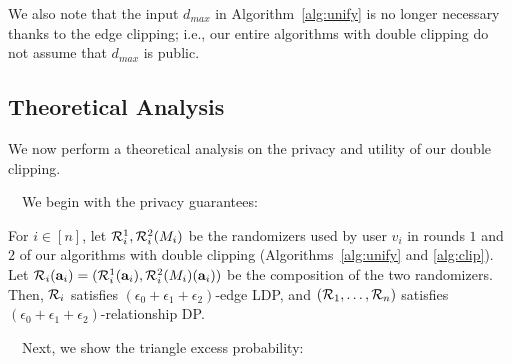 We also note that the input $d_{max}$ in Algorithm~\ref{alg:unify} is no longer necessary thanks to the edge clipping; i.e., our entire algorithms with double clipping do not assume that $d_{max}$ is public. 

\subsection{Theoretical Analysis}
\label{sub:clip_theoretical_analysis}
We now perform a theoretical analysis on the privacy and utility of our double clipping. 

\smallskip
{}~~We begin with the privacy guarantees:
\begin{theorem}\label{thm:privacy_DC}
  For $i \in [n]$, 
  let $\mathcal{R}_i^1, \mathcal{R}_i^2(M_i)$ be the randomizers used by user $v_i$ in
  rounds $1$ and $2$ of our algorithms with double clipping (Algorithms~\ref{alg:unify} and \ref{alg:clip}). 
  Let $\mathcal{R}_i(\mathbf{a}_i) = (\mathcal{R}_i^1(\mathbf{a}_i), \mathcal{R}_i^2(M_i)(\mathbf{a}_i))$ 
  be the composition of the two randomizers. 
  Then,
  $\mathcal{R}_i$ satisfies $(\epsilon_0 + \epsilon_1 + \epsilon_2)$-edge LDP, 
  and $(\mathcal{R}_1,
  \ldots, \mathcal{R}_n)$ satisfies $(\epsilon_0 + \epsilon_1 + \epsilon_2)$-relationship DP.
\end{theorem}

\smallskip
{}~~Next, we show the triangle excess probability: 

